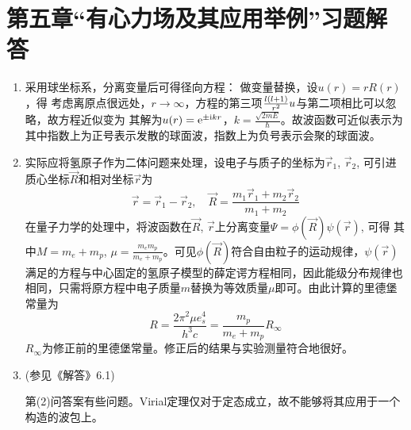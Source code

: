 \section{第五章“有心力场及其应用举例”习题解答}

\begin{enumerate}[label=\textbf{5.\arabic*}, listparindent=\parindent, leftmargin=-0.5mm]

\setcounter{enumi}{0}

\item 采用球坐标系，分离变量后可得径向方程：
做变量替换，设$u(r)=rR(r)$，得
考虑离原点很远处，$r\to\infty$，方程的第三项$\frac{l\left(l+1\right)}{r^2}u$与第二项相比可以忽略，故方程近似变为
其解为$u(r)=\mathrm{e}^{\pm\mathrm{i} kr}$，$k=\frac{\sqrt{2mE}}{\hbar}$。故波函数可近似表示为
其中指数上为正号表示发散的球面波，指数上为负号表示会聚的球面波。


\item 实际应将氢原子作为二体问题来处理，设电子与质子的坐标为$\vec{r}_1$, $\vec{r}_2$, 可引进质心坐标$\vec{R}$和相对坐标$\vec{r}$为
\[\vec{r}=\vec{r}_1-\vec{r}_2,\quad \vec{R}=\frac{m_1\vec{r}_1+m_2\vec{r}_2}{m_1+m_2}\]
在量子力学的处理中，将波函数在$\vec{R}$, $\vec{r}$上分离变量$\Psi=\phi(\vec{R})\psi(\vec{r})$, 可得
其中$M=m_e+m_p$, $\mu=\frac{m_em_p}{m_e+m_p}$。可见$\phi(\vec{R})$符合自由粒子的运动规律，$\psi(\vec{r})$满足的方程与中心固定的氢原子模型的薛定谔方程相同，因此能级分布规律也相同，只需将原方程中电子质量$m$替换为等效质量$\mu$即可。由此计算的里德堡常量为
\[R = \frac{2\pi^2 \mu e_s^4}{h^3 c} = \frac{m_p}{m_e+m_p}R_\infty\]
$R_\infty$为修正前的里德堡常量。修正后的结果与实验测量符合地很好。

\item (参见《解答》6.1) 

第(2)问答案有些问题。Virial定理仅对于定态成立，故不能够将其应用于一个构造的波包上。


\end{enumerate}
